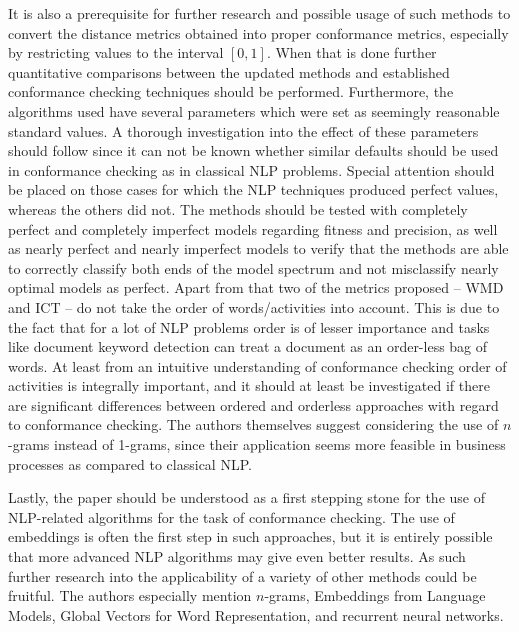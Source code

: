 \documentclass[runningheads]{template/llncs}
\begin{document}
\color{blue}
It is also a  prerequisite for further research and possible usage of such methods to convert the distance metrics obtained into proper conformance metrics, especially by restricting values to the interval $[0,1]$.
When that is done further quantitative comparisons between the updated methods and established conformance checking techniques should be performed.
Furthermore, the algorithms used have several parameters which were set as seemingly reasonable standard values.
A thorough investigation into the effect of these parameters should follow since it can not be known whether similar defaults should be used in conformance checking  as in classical NLP problems.
Special attention should be placed on those cases for which the NLP techniques produced perfect values, whereas the others did not.
The methods should be tested with completely perfect and completely imperfect models regarding fitness and precision, as well as nearly perfect and nearly imperfect models to verify that the methods are able to correctly classify both ends of the model spectrum and not misclassify nearly optimal models as perfect.
\color{black}
Apart from that two of the metrics proposed -- WMD and ICT -- do not take the order of words/activities into account.
This is due to the fact that for a lot of NLP problems order is of lesser importance and tasks like document keyword detection can treat a document as an order-less bag of words.
At least from an intuitive understanding of conformance checking order of activities is integrally important, and it should at least be investigated if there are significant differences between ordered and orderless approaches with regard to conformance checking.
The authors themselves suggest considering the use of $n$-grams instead of 1-grams, since their application seems more feasible in business processes as compared to classical NLP.

Lastly, the paper should be understood as a first stepping stone for the use of NLP-related algorithms for the task of conformance checking.
The use of embeddings is often the first step in such approaches, but it is entirely possible that more advanced NLP algorithms may give even better results.
As such further research into the applicability of a variety of other methods could be fruitful.
The authors especially mention $n$-grams, Embeddings from Language Models, Global Vectors for Word Representation, and recurrent neural networks.

\color{red}
\end{document}
